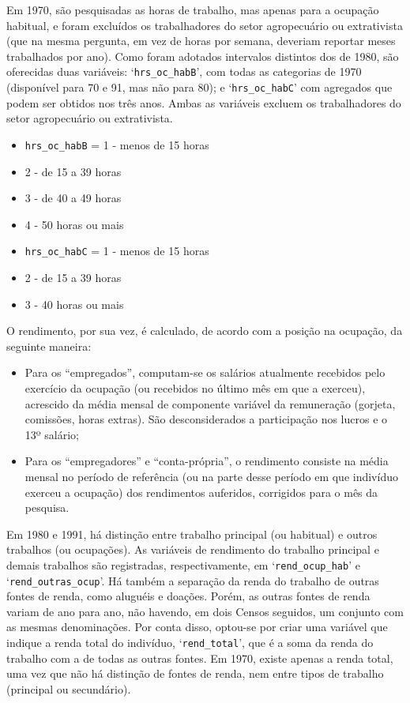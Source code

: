 \documentclass[12pt,a4paper]{article}
\newcommand{\vr}[1]{\texttt{#1}}
\begin{document}
Em 1970, são pesquisadas as horas de trabalho, mas apenas para a ocupação habitual, e foram excluídos os trabalhadores do setor agropecuário ou extrativista (que na mesma pergunta, em vez de horas por semana, deveriam reportar meses trabalhados por ano). Como foram adotados intervalos distintos dos de 1980, são oferecidas duas variáveis: ‘\vr{hrs\_oc\_habB}’, com todas as categorias de 1970 (disponível para 70 e 91, mas não para 80); e ‘\vr{hrs\_oc\_habC}’ com agregados que podem ser obtidos nos três anos. Ambas as variáveis excluem os trabalhadores do setor agropecuário ou extrativista.
\begin{itemize}
  \item \vr{hrs\_oc\_habB} = 1 - menos de 15 horas
  \item 2 - de 15 a 39 horas
  \item 3 - de 40 a 49 horas
  \item 4 - 50 horas ou mais
  \item \vr{hrs\_oc\_habC} = 1 - menos de 15 horas
  \item 2 - de 15 a 39 horas
  \item 3 - 40 horas ou mais
\end{itemize}

O rendimento, por sua vez, é calculado, de acordo com a posição na ocupação, da seguinte maneira:
\begin{itemize}
  \item Para os “empregados”, computam-se os salários atualmente recebidos pelo exercício da ocupação (ou recebidos no último mês em que a exerceu), acrescido da média mensal de componente variável da remuneração (gorjeta, comissões, horas extras). São desconsiderados a participação nos lucros e o 13º salário;
  \item Para os “empregadores” e “conta-própria”, o rendimento consiste na média mensal no período de referência (ou na parte desse período em que indivíduo exerceu a ocupação) dos rendimentos auferidos, corrigidos para o mês da pesquisa.
\end{itemize}

Em 1980 e 1991, há distinção entre trabalho principal (ou habitual) e outros trabalhos (ou ocupações). As variáveis de rendimento do trabalho principal e demais trabalhos são registradas, respectivamente, em ‘\vr{rend\_ocup\_hab}’ e ‘\vr{rend\_outras\_ocup}’. Há também a separação da renda do trabalho de outras fontes de renda, como aluguéis e doações. Porém, as outras fontes de renda variam de ano para ano, não havendo, em dois Censos seguidos, um conjunto com as mesmas denominações. Por conta disso, optou-se por criar uma variável que indique a renda total do indivíduo, ‘\vr{rend\_total}’, que é a soma da renda do trabalho com a de todas as outras fontes. Em 1970, existe apenas a renda total, uma vez que não há distinção de fontes de renda, nem entre tipos de trabalho (principal ou secundário).
\end{document}
